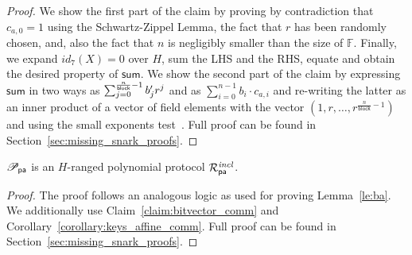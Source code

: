 \begin{proof}
We show the first part of the claim by proving by contradiction that $c_{a,0} =1$ using the Schwartz-Zippel Lemma, the fact that $r$ has been 
randomly chosen, and, also the fact that $n$ is negligibly smaller than the size of $\mathbb{F}$. Finally, we expand $\mathit{id_7}(X) = 0$ 
over $H$, sum the LHS and the RHS, equate and obtain the desired property of $\mathsf{sum}$. We show the second part of 
the claim by expressing $\mathsf{sum}$ in two ways as $\sum_{j=0}^{\frac{n}{\mathsf{block}}-1} b'_{j}r^j $ and as $\sum_{i=0}^{n-1} b_i \cdot c_{a,i}$ and re-writing the 
latter as an inner product of a vector of field elements with the vector $(1, r, \ldots, r^{\frac{n}{\mathsf{block}}-1})$ and using the small exponents test~\cite{small_exponents}. 
Full proof can be found in Section~\ref{sec:missing_snark_proofs}.
\end{proof}
\vspace{-0.1in}

\begin{lemma} 
$\mathscr{P}_{\mathsf{pa}}$ is an $H$-ranged polynomial protocol $\mathcal{R}^{\mathit{incl}}_{\mathsf{pa}}$.
\end{lemma}
\vspace{-0.15in}

\begin{proof} 
The proof follows an analogous logic as used for proving Lemma~\ref{le:ba}. We additionally use 
Claim~\ref{claim:bitvector_comm} and Corollary~\ref{corollary:keys_affine_comm}. Full proof can be found in Section~\ref{sec:missing_snark_proofs}.
\end{proof}
\vspace{-0.15in}

